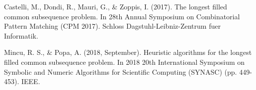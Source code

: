 \documentclass[]{article}
\begin{document}




\begin{thebibliography}{9}
		Castelli, M., Dondi, R., Mauri, G., \& Zoppis, I. (2017). The longest filled common subsequence problem. In 28th Annual Symposium on Combinatorial Pattern Matching (CPM 2017). Schloss Dagstuhl-Leibniz-Zentrum fuer Informatik.
	
	    Mincu, R. S., \& Popa, A. (2018, September). Heuristic algorithms for the longest filled common subsequence problem. In 2018 20th International Symposium on Symbolic and Numeric Algorithms for Scientific Computing (SYNASC) (pp. 449-453). IEEE.
\end{thebibliography}
\end{document}
